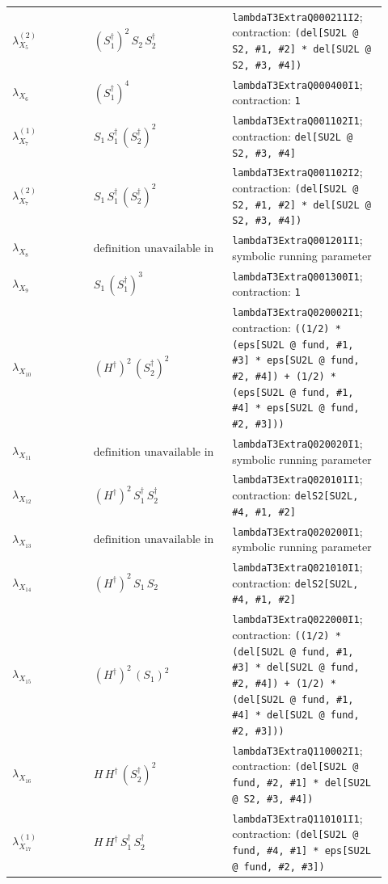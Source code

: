 \documentclass[8pt]{article}
\begin{document}
\begin{landscape}
\begin{longtable}{@{}p{0.20\linewidth}p{0.34\linewidth}p{0.38\linewidth}@{}}
$\lambda_{X_{5}}^{(2)}$ & $(S_1^\dagger)^{2}\,S_2\,S_2^\dagger$ & \texttt{lambdaT3ExtraQ000211I2}; contraction: \texttt{(del[SU2L @ S2, \#1, \#2] * del[SU2L @ S2, \#3, \#4])} \\
$\lambda_{X_{6}}$ & $(S_1^\dagger)^{4}$ & \texttt{lambdaT3ExtraQ000400I1}; contraction: \texttt{1} \\
$\lambda_{X_{7}}^{(1)}$ & $S_1\,S_1^\dagger\,(S_2^\dagger)^{2}$ & \texttt{lambdaT3ExtraQ001102I1}; contraction: \texttt{del[SU2L @ S2, \#3, \#4]} \\
$\lambda_{X_{7}}^{(2)}$ & $S_1\,S_1^\dagger\,(S_2^\dagger)^{2}$ & \texttt{lambdaT3ExtraQ001102I2}; contraction: \texttt{(del[SU2L @ S2, \#1, \#2] * del[SU2L @ S2, \#3, \#4])} \\
$\lambda_{X_{8}}$ & $\text{definition unavailable in registry}$ & \texttt{lambdaT3ExtraQ001201I1}; symbolic running parameter \\
$\lambda_{X_{9}}$ & $S_1\,(S_1^\dagger)^{3}$ & \texttt{lambdaT3ExtraQ001300I1}; contraction: \texttt{1} \\
$\lambda_{X_{10}}$ & $(H^\dagger)^{2}\,(S_2^\dagger)^{2}$ & \texttt{lambdaT3ExtraQ020002I1}; contraction: \texttt{((1/2) * (eps[SU2L @ fund, \#1, \#3] * eps[SU2L @ fund, \#2, \#4]) + (1/2) * (eps[SU2L @ fund, \#1, \#4] * eps[SU2L @ fund, \#2, \#3]))} \\
$\lambda_{X_{11}}$ & $\text{definition unavailable in registry}$ & \texttt{lambdaT3ExtraQ020020I1}; symbolic running parameter \\
$\lambda_{X_{12}}$ & $(H^\dagger)^{2}\,S_1^\dagger\,S_2^\dagger$ & \texttt{lambdaT3ExtraQ020101I1}; contraction: \texttt{delS2[SU2L, \#4, \#1, \#2]} \\
$\lambda_{X_{13}}$ & $\text{definition unavailable in registry}$ & \texttt{lambdaT3ExtraQ020200I1}; symbolic running parameter \\
$\lambda_{X_{14}}$ & $(H^\dagger)^{2}\,S_1\,S_2$ & \texttt{lambdaT3ExtraQ021010I1}; contraction: \texttt{delS2[SU2L, \#4, \#1, \#2]} \\
$\lambda_{X_{15}}$ & $(H^\dagger)^{2}\,(S_1)^{2}$ & \texttt{lambdaT3ExtraQ022000I1}; contraction: \texttt{((1/2) * (del[SU2L @ fund, \#1, \#3] * del[SU2L @ fund, \#2, \#4]) + (1/2) * (del[SU2L @ fund, \#1, \#4] * del[SU2L @ fund, \#2, \#3]))} \\
$\lambda_{X_{16}}$ & $H\,H^\dagger\,(S_2^\dagger)^{2}$ & \texttt{lambdaT3ExtraQ110002I1}; contraction: \texttt{(del[SU2L @ fund, \#2, \#1] * del[SU2L @ S2, \#3, \#4])} \\
$\lambda_{X_{17}}^{(1)}$ & $H\,H^\dagger\,S_1^\dagger\,S_2^\dagger$ & \texttt{lambdaT3ExtraQ110101I1}; contraction: \texttt{(del[SU2L @ fund, \#4, \#1] * eps[SU2L @ fund, \#2, \#3])} \\

\end{longtable}
\end{landscape}
\end{document}
